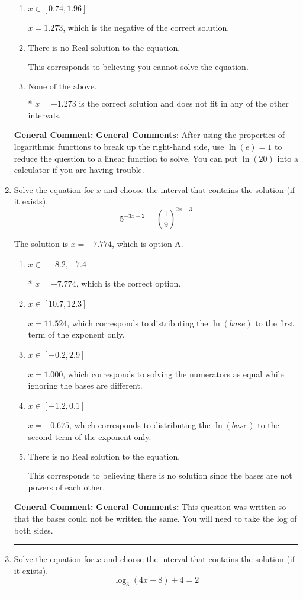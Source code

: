 \documentclass{extbook}[14pt]
\newcommand{\litem}[1]{\item #1

\rule{\textwidth}{0.4pt}}
\begin{document}
\begin{enumerate}
{\begin{enumerate}[label=\Alph*.]
$x = -0.309$, which corresponds to treating any root as a square root.
\item \( x \in [0.74, 1.96] \)

$x = 1.273$, which is the negative of the correct solution.
\item \( \text{There is no Real solution to the equation.} \)

This corresponds to believing you cannot solve the equation.
\item \( \text{None of the above.} \)

* $x = -1.273$ is the correct solution and does not fit in any of the other intervals.
\end{enumerate}

\textbf{General Comment:} \textbf{General Comments}: After using the properties of logarithmic functions to break up the right-hand side, use $\ln(e) = 1$ to reduce the question to a linear function to solve. You can put $\ln(20)$ into a calculator if you are having trouble.
}
\litem{
Solve the equation for $x$ and choose the interval that contains the solution (if it exists).
\[ 5^{-3x+2} = \left(\frac{1}{9}\right)^{2x-3} \]

The solution is \( x = -7.774 \), which is option A.\begin{enumerate}[label=\Alph*.]
\item \( x \in [-8.2, -7.4] \)

* $x = -7.774$, which is the correct option.
\item \( x \in [10.7, 12.3] \)

$x = 11.524$, which corresponds to distributing the $\ln(base)$ to the first term of the exponent only.
\item \( x \in [-0.2, 2.9] \)

$x = 1.000$, which corresponds to solving the numerators as equal while ignoring the bases are different.
\item \( x \in [-1.2, 0.1] \)

$x = -0.675$, which corresponds to distributing the $\ln(base)$ to the second term of the exponent only.
\item \( \text{There is no Real solution to the equation.} \)

This corresponds to believing there is no solution since the bases are not powers of each other.
\end{enumerate}

\textbf{General Comment:} \textbf{General Comments:} This question was written so that the bases could not be written the same. You will need to take the log of both sides.
}
\litem{
Solve the equation for $x$ and choose the interval that contains the solution (if it exists).
\[ \log_{3}{(4x+8)}+4 = 2 \]

}
\end{enumerate}
\end{document}
